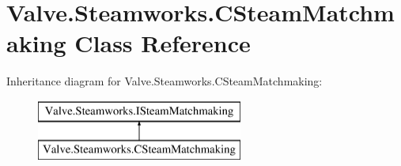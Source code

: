 \hypertarget{classValve_1_1Steamworks_1_1CSteamMatchmaking}{}\section{Valve.\+Steamworks.\+C\+Steam\+Matchmaking Class Reference}
\label{classValve_1_1Steamworks_1_1CSteamMatchmaking}
Inheritance diagram for Valve.\+Steamworks.\+C\+Steam\+Matchmaking\+:\begin{figure}[H]
\begin{center}
\leavevmode
\includegraphics[height=2.000000cm]{classValve_1_1Steamworks_1_1CSteamMatchmaking}
\end{center}
\end{figure}
